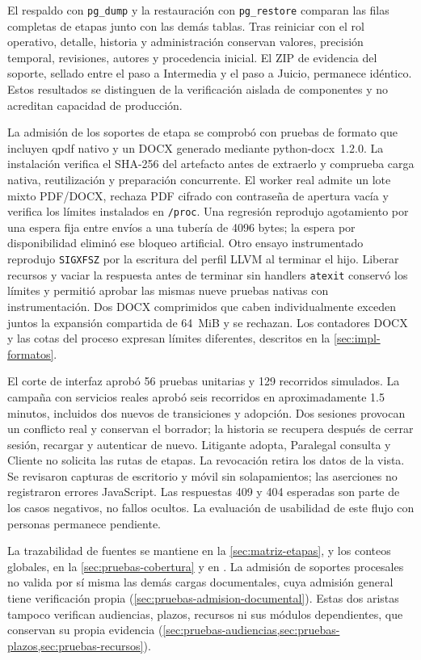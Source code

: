 El respaldo con \texttt{pg\_dump} y la restauración con \texttt{pg\_restore} comparan las filas completas de etapas junto con las demás tablas. Tras reiniciar con el rol operativo, detalle, historia y administración conservan valores, precisión temporal, revisiones, autores y procedencia inicial. El ZIP de evidencia del soporte, sellado entre el paso a Intermedia y el paso a Juicio, permanece idéntico. Estos resultados se distinguen de la verificación aislada de componentes y no acreditan capacidad de producción.

La admisión de los soportes de etapa se comprobó con pruebas de formato que incluyen qpdf nativo y un DOCX generado mediante python-docx~1.2.0. La instalación verifica el SHA-256 del artefacto antes de extraerlo y comprueba carga nativa, reutilización y preparación concurrente. El worker real admite un lote mixto PDF/DOCX, rechaza PDF cifrado con contraseña de apertura vacía y verifica los límites instalados en \texttt{/proc}. Una regresión reprodujo agotamiento por una espera fija entre envíos a una tubería de 4096 bytes; la espera por disponibilidad eliminó ese bloqueo artificial. Otro ensayo instrumentado reprodujo \texttt{SIGXFSZ} por la escritura del perfil LLVM al terminar el hijo. Liberar recursos y vaciar la respuesta antes de terminar sin handlers \texttt{atexit} conservó los límites y permitió aprobar las mismas nueve pruebas nativas con instrumentación. Dos DOCX comprimidos que caben individualmente exceden juntos la expansión compartida de 64~MiB y se rechazan. Los contadores DOCX y las cotas del proceso expresan límites diferentes, descritos en la \cref{sec:impl-formatos}.

El corte de interfaz aprobó 56 pruebas unitarias y 129 recorridos simulados. La campaña con servicios reales aprobó seis recorridos en aproximadamente 1.5 minutos, incluidos dos nuevos de transiciones y adopción. Dos sesiones provocan un conflicto real y conservan el borrador; la historia se recupera después de cerrar sesión, recargar y autenticar de nuevo. Litigante adopta, Paralegal consulta y Cliente no solicita las rutas de etapas. La revocación retira los datos de la vista. Se revisaron capturas de escritorio y móvil sin solapamientos; las aserciones no registraron errores JavaScript. Las respuestas 409 y 404 esperadas son parte de los casos negativos, no fallos ocultos. La evaluación de usabilidad de este flujo con personas permanece pendiente.

{\raggedright La trazabilidad de fuentes se mantiene en la \cref{sec:matriz-etapas}, y los conteos globales, en la \cref{sec:pruebas-cobertura} y en . La admisión de soportes procesales no valida por sí misma las demás cargas documentales, cuya admisión general tiene verificación propia (\cref{sec:pruebas-admision-documental}). Estas dos aristas tampoco verifican audiencias, plazos, recursos ni sus módulos dependientes, que conservan su propia evidencia (\cref{sec:pruebas-audiencias,sec:pruebas-plazos,sec:pruebas-recursos}).\par}

